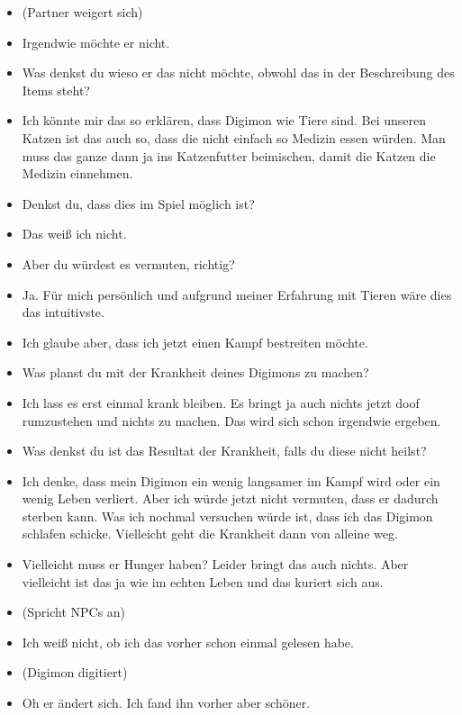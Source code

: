 {\begin{itemize}[]
    \item {} (Partner weigert sich)
    \item {} Irgendwie möchte er nicht.
    \item {} Was denkst du wieso er das nicht möchte, obwohl das in der Beschreibung des Items steht?
    \item {} Ich könnte mir das so erklären, dass Digimon wie Tiere sind. Bei unseren Katzen ist das auch so, dass die nicht einfach so Medizin essen würden. Man muss das ganze dann ja ins Katzenfutter beimischen, damit die Katzen die Medizin einnehmen. 
    \item {} Denkst du, dass dies im Spiel möglich ist?
    \item {} Das weiß ich nicht.
    \item {} Aber du würdest es vermuten, richtig?
    \item {} Ja. Für mich persönlich und aufgrund meiner Erfahrung mit Tieren wäre dies das intuitivste.
    \item {} Ich glaube aber, dass ich jetzt einen Kampf bestreiten möchte.
    \item {} Was planst du mit der Krankheit deines Digimons zu machen?
    \item {} Ich lass es erst einmal krank bleiben. Es bringt ja auch nichts jetzt doof rumzustehen und nichts zu machen. Das wird sich schon irgendwie ergeben.
    \item {} Was denkst du ist das Resultat der Krankheit, falls du diese nicht heilst?
    \item {} Ich denke, dass mein Digimon ein wenig langsamer im Kampf wird oder ein wenig Leben verliert. Aber ich würde jetzt nicht vermuten, dass er dadurch sterben kann. Was ich nochmal versuchen würde ist, dass ich das Digimon schlafen schicke. Vielleicht geht die Krankheit dann von alleine weg. 
    \item {} Vielleicht muss er Hunger haben? Leider bringt das auch nichts. Aber vielleicht ist das ja wie im echten Leben und das kuriert sich aus.
    \item {} (Spricht NPCs an)
    \item {} Ich weiß nicht, ob ich das vorher schon einmal gelesen habe.
    \item {} (Digimon digitiert)
    \item {} Oh er ändert sich. Ich fand ihn vorher aber schöner. 

\end{itemize}}
